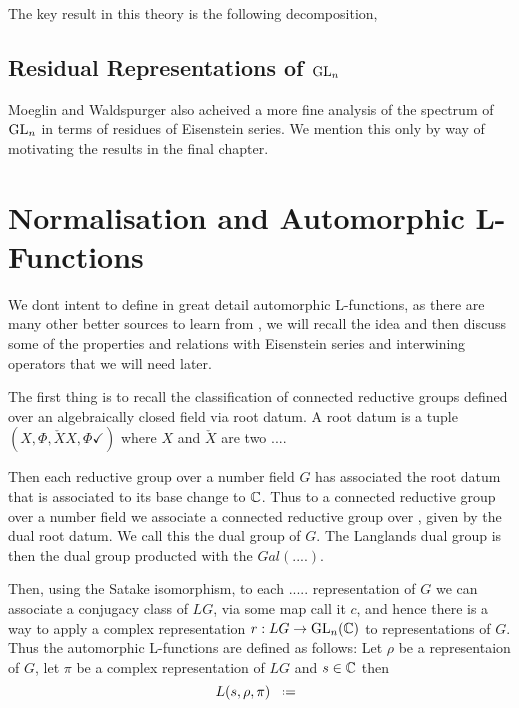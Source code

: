 The key result in this theory is the following decomposition,
\begin{Theorem}
    
\end{Theorem}

\subsection{Residual Representations of \(\operatorname{GL}_n\)}
Moeglin and Waldspurger also acheived a more fine analysis of the spectrum of \(\operatorname{GL}_n\) in terms of residues of Eisenstein series. We mention this only by way of motivating the results in the final chapter. 

\section{Normalisation and Automorphic L-Functions}
We dont intent to define in great detail automorphic L-functions, as there are many other better sources to learn from \cite[Part 2.III.2]{borelAutomorphicFormsRepresentations1979}\cite{shahidiEisensteinSeriesAutomorphic2010}\cite{cogdellLFUNCTIONSFUNCTORIALITY}\cite[9, 10, 11]{bumpIntroductionLanglandsProgram2004}, we will recall the idea and then discuss some of the properties and relations with Eisenstein series and interwining operators that we will need later.

The first thing is to recall the classification of connected reductive groups defined over an algebraically closed field via root datum. A root datum is a tuple \((X, \Phi, \check{X} X, \Phi\checkmark)\) where \(X\) and \(\check{X}\) are two .... 

Then each reductive group over a number field \(G\) has associated the root datum that is associated to its base change to \(\C\). Thus to a connected reductive group over a number field we associate a connected reductive group over \C, given by the dual root datum. We call this the dual group of \(G\). The Langlands dual group is then the dual group producted with the \(Gal(....)\).

\begin{example}
    
\end{example}

Then, using the Satake isomorphism, to each ..... representation of \(G\) we can associate a conjugacy class of \(LG\), via some map call it \(c\), and hence there is a way to apply a complex representation \(r: LG \to \GL_n(\C)\) to representations of \(G\). Thus the automorphic L-functions are defined as follows: Let \(\rho\) be a representaion of \(G\), let \(\pi\) be a complex representation of \(LG\) and \(s\in \C\) then 
\[L(s, \rho, \pi) \defeq \]

